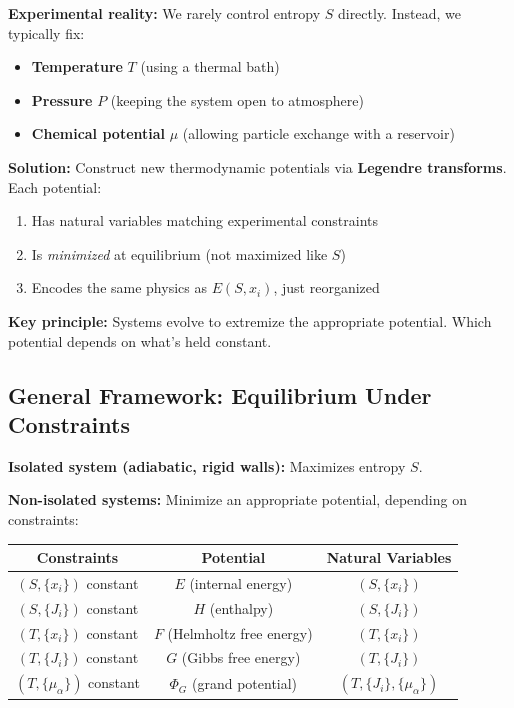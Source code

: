 \documentclass[9pt,twocoloumn]{article}
\begin{document}
\textbf{Experimental reality:} We rarely control entropy $S$ directly. Instead, we typically fix:
\begin{itemize}
    \item \textbf{Temperature} $T$ (using a thermal bath)
    \item \textbf{Pressure} $P$ (keeping the system open to atmosphere)
    \item \textbf{Chemical potential} $\mu$ (allowing particle exchange with a reservoir)
\end{itemize}

\textbf{Solution:} Construct new thermodynamic potentials via \textbf{Legendre transforms}. Each potential:
\begin{enumerate}
    \item Has natural variables matching experimental constraints
    \item Is \emph{minimized} at equilibrium (not maximized like $S$)
    \item Encodes the same physics as $E(S, x_i)$, just reorganized
\end{enumerate}

\textbf{Key principle:} Systems evolve to extremize the appropriate potential. Which potential depends on what's held constant.

\subsection{General Framework: Equilibrium Under Constraints}

\textbf{Isolated system (adiabatic, rigid walls):} Maximizes entropy $S$.

\textbf{Non-isolated systems:} Minimize an appropriate potential, depending on constraints:

\begin{center}
\begin{tabular}{ccc}
\hline
\textbf{Constraints} & \textbf{Potential} & \textbf{Natural Variables} \\
\hline
$(S, \{x_i\})$ constant & $E$ (internal energy) & $(S, \{x_i\})$ \\
$(S, \{J_i\})$ constant & $H$ (enthalpy) & $(S, \{J_i\})$ \\
$(T, \{x_i\})$ constant & $F$ (Helmholtz free energy) & $(T, \{x_i\})$ \\
$(T, \{J_i\})$ constant & $G$ (Gibbs free energy) & $(T, \{J_i\})$ \\
$(T, \{\mu_\alpha\})$ constant & $\Phi_G$ (grand potential) & $(T, \{J_i\}, \{\mu_\alpha\})$ \\
\hline
\end{tabular}
\end{center}
\end{document}
